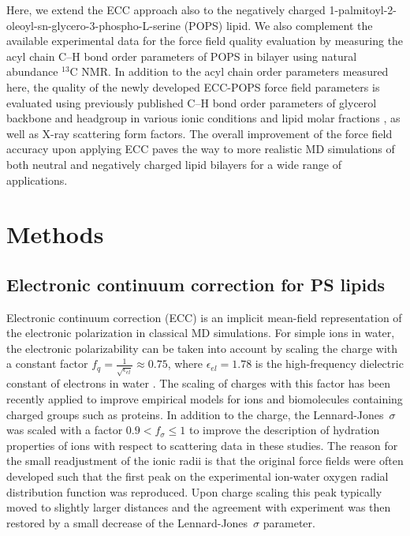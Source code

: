 \documentclass[journal=jpcbfk,manuscript=article]{achemso}
\begin{document}
Here, we extend the ECC approach also to the negatively charged 1-palmitoyl-2-oleoyl-sn-glycero-3-phospho-L-serine (POPS) lipid.
We also complement the available experimental data for the force field quality
evaluation by measuring the acyl chain C--H bond order parameters of POPS in bilayer using natural abundance $^{13}$C NMR.
In addition to the acyl chain order parameters measured here, the quality of the newly developed ECC-POPS force field parameters is
evaluated using previously published C--H bond order parameters of glycerol backbone and headgroup in various ionic
conditions and lipid molar fractions \cite{roux90,NMRlipidsIV}, as well as X-ray scattering form factors\cite{kucerka14}.
The overall improvement of the force field accuracy upon applying ECC
paves the way to more realistic MD simulations 
of both neutral and negatively charged lipid bilayers 
for a wide range of applications.

\section{Methods} 
 
\subsection{Electronic continuum correction for PS lipids}\label{section:ecc} 

Electronic continuum correction (ECC) is an implicit mean-field representation of 
the electronic polarization in classical MD simulations. 
For simple ions in water, the electronic polarizability
can be taken into account by scaling the charge with a constant factor 
 \mbox{$ f_q = \frac{1}{\sqrt{\epsilon_{el}}} \approx 0.75$,}
where  $\epsilon_{el} = 1.78$ is the high-frequency dielectric constant of electrons in water \cite{leontyev09}.
The scaling of charges with this factor has been recently applied to improve empirical models for ions and
 biomolecules containing charged groups such as proteins\cite{Pluharova2014, martinek17, duboue2018insulin, Mason2019, Duboue2018MgZn}.
In addition to the charge, the Lennard-Jones~$\sigma$ was scaled with a factor $ 0.9 < f_\sigma \leq 1$
to improve the description of hydration properties of ions with respect to scattering data in these studies. The reason for the small readjustment of the ionic radii is that the original force fields were often developed such that the first peak on the experimental ion-water oxygen radial distribution function was reproduced. Upon charge scaling this peak typically moved to slightly larger distances and the agreement with experiment was then restored by a small decrease of the Lennard-Jones~$\sigma$ parameter.
\end{document}
